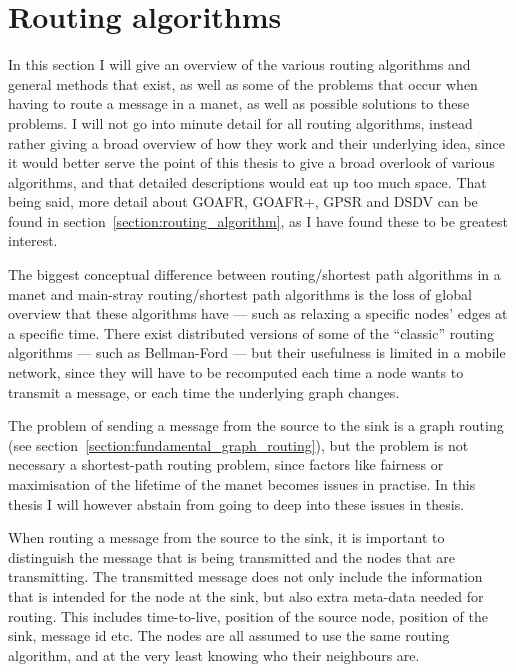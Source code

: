 \section{Routing algorithms}
\label{section:routing_algorithms}

In this section I will give an overview of the various routing algorithms and general methods that exist, as well as some of the problems that occur when having to route a message in a \ac{manet}, as well as possible solutions to these problems. I will not go into minute detail for all routing algorithms, instead rather giving a broad overview of how they work and their underlying idea, since it would better serve the point of this thesis to give a broad overlook of various algorithms, and that detailed descriptions would eat up too much space. That being said, more detail about GOAFR, GOAFR+, GPSR and DSDV can be found in section~\ref{section:routing_algorithm}, as I have found these to be greatest interest.

The biggest conceptual difference between routing/shortest path algorithms in a \ac{manet} and main-stray routing/shortest path algorithms is the loss of global overview that these algorithms have --- such as relaxing a specific nodes' edges at a specific time. There exist distributed versions of some of the ``classic'' routing algorithms --- such as Bellman-Ford --- but their usefulness is limited in a mobile network, since they will have to be recomputed each time a node wants to transmit a message, or each time the underlying graph changes.

The problem of sending a message from the source to the sink is a graph routing (see section~\ref{section:fundamental_graph_routing}), but the problem is not necessary a shortest-path routing problem, since factors like fairness or maximisation of the lifetime of the \ac{manet} becomes issues in practise. In this thesis I will however abstain from going to deep into these issues in thesis.

When routing a message from the source to the sink, it is important to distinguish the message that is being transmitted and the nodes that are transmitting. The transmitted message does not only include the information that is intended for the node at the sink, but also extra meta-data needed for routing. This includes time-to-live, position of the source node, position of the sink, message id etc. The nodes are all assumed to use the same routing algorithm, and at the very least knowing who their neighbours are.

